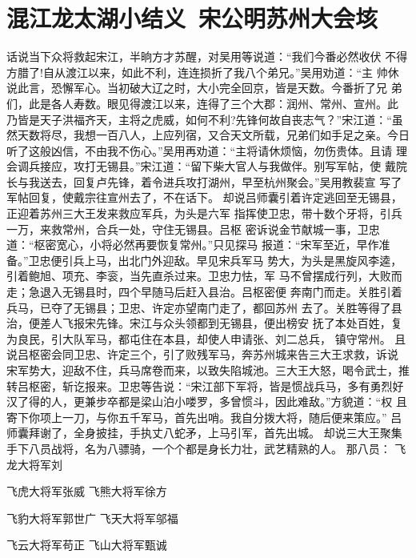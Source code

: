 \chapter{混江龙太湖小结义~宋公明苏州大会垓}

话说当下众将救起宋江，半晌方才苏醒，对吴用等说道：“我们今番必然收伏
不得方腊了!自从渡江以来，如此不利，连连损折了我八个弟兄。”吴用劝道：“主
帅休说此言，恐懈军心。当初破大辽之时，大小完全回京，皆是天数。今番折了兄
弟们，此是各人寿数。眼见得渡江以来，连得了三个大郡：润州、常州、宣州。此
乃皆是天子洪福齐天，主将之虎威，如何不利?先锋何故自丧志气？”宋江道：“虽
然天数将尽，我想一百八人，上应列宿，又合天文所载，兄弟们如手足之亲。今日
听了这般凶信，不由我不伤心。”吴用再劝道：“主将请休烦恼，勿伤贵体。且请
理会调兵接应，攻打无锡县。”宋江道：“留下柴大官人与我做伴。别写军帖，使
戴院长与我送去，回复卢先锋，着令进兵攻打湖州，早至杭州聚会。”吴用教裴宣
写了军帖回复，使戴宗往宣州去了，不在话下。
却说吕师囊引着许定逃回至无锡县，正迎着苏州三大王发来救应军兵，为头是六军
指挥使卫忠，带十数个牙将，引兵一万，来救常州，合兵一处，守住无锡县。吕枢
密诉说金节献城一事，卫忠道：“枢密宽心，小将必然再要恢复常州。”只见探马
报道：“宋军至近，早作准备。”卫忠便引兵上马，出北门外迎敌。早见宋兵军马
势大，为头是黑旋风李逵，引着鲍旭、项充、李衮，当先直杀过来。卫忠力怯，军
马不曾摆成行列，大败而走；急退入无锡县时，四个早随马后赶入县治。吕枢密便
奔南门而走。关胜引着兵马，已夺了无锡县；卫忠、许定亦望南门走了，都回苏州
去了。关胜等得了县治，便差人飞报宋先锋。宋江与众头领都到无锡县，便出榜安
抚了本处百姓，复为良民，引大队军马，都屯住在本县，却使人申请张、刘二总兵，
镇守常州。
且说吕枢密会同卫忠、许定三个，引了败残军马，奔苏州城来告三大王求救，诉说
宋军势大，迎敌不住，兵马席卷而来，以致失陷城池。三大王大怒，喝令武士，推
转吕枢密，斩讫报来。卫忠等告说：“宋江部下军将，皆是惯战兵马，多有勇烈好
汉了得的人，更兼步卒都是梁山泊小喽罗，多曾惯斗，因此难敌。”方貌道：“权
且寄下你项上一刀，与你五千军马，首先出哨。我自分拨大将，随后便来策应。”
吕师囊拜谢了，全身披挂，手执丈八蛇矛，上马引军，首先出城。
却说三大王聚集手下八员战将，名为八骠骑，一个个都是身长力壮，武艺精熟的人。
那八员：
飞龙大将军刘

飞虎大将军张威
飞熊大将军徐方

飞豹大将军郭世广
飞天大将军邬福

飞云大将军苟正
飞山大将军甄诚

